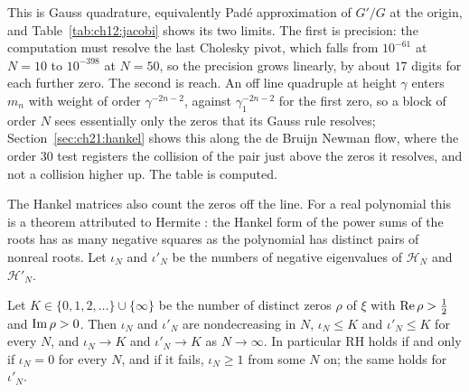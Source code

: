 This is Gauss quadrature, equivalently Pad\'e approximation of $G'/G$ at the origin, and Table~\ref{tab:ch12:jacobi} shows its two limits. The first is precision: the computation must resolve the last Cholesky pivot, which falls from $10^{-61}$ at $N=10$ to $10^{-398}$ at $N=50$, so the precision grows linearly, by about $17$ digits for each further zero. The second is reach. An off line quadruple at height $\gamma$ enters $m_n$ with weight of order $\gamma^{-2n-2}$, against $\gamma_1^{-2n-2}$ for the first zero, so a block of order $N$ sees essentially only the zeros that its Gauss rule resolves; Section~\ref{sec:ch21:hankel} shows this along the de Bruijn Newman flow, where the order $30$ test registers the collision of the pair just above the zeros it resolves, and not a collision higher up. The table is computed.

The Hankel matrices also count the zeros off the line. For a real polynomial this is a theorem attributed to Hermite \cite{Hermite1856}: the Hankel form of the power sums of the roots has as many negative squares as the polynomial has distinct pairs of nonreal roots. Let $\iota_N$ and $\iota'_N$ be the numbers of negative eigenvalues of $\mathcal H_N$ and $\mathcal H'_N$.

\begin{theorem}\label{thm:ch12:inertia}
Let $K\in\{0,1,2,\dots\}\cup\{\infty\}$ be the number of distinct zeros $\rho$ of $\xi$ with $\operatorname{Re}\rho>\frac12$ and $\operatorname{Im}\rho>0$. Then $\iota_N$ and $\iota'_N$ are nondecreasing in $N$, $\iota_N\le K$ and $\iota'_N\le K$ for every $N$, and $\iota_N\to K$ and $\iota'_N\to K$ as $N\to\infty$. In particular RH holds if and only if $\iota_N=0$ for every $N$, and if it fails, $\iota_N\ge1$ from some $N$ on; the same holds for $\iota'_N$.
\end{theorem}

